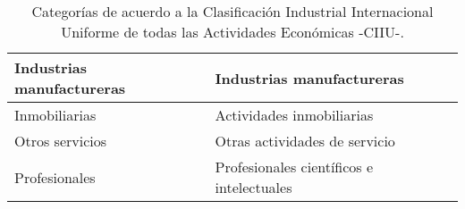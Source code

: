 \begin{description}
\begin{table}[ht]
\begin{tabular}{|l|l|}
Industrias manufactureras                              & Industrias manufactureras                                                                        \\ \hline
Inmobiliarias                                          & Actividades inmobiliarias                                                                        \\ \hline
Otros servicios                                        & Otras actividades de servicio                                                                    \\ \hline
Profesionales                                          & Profesionales científicos e intelectuales                                                        \\ \hline
\end{tabular}
\caption{Categorías de acuerdo a la Clasificación Industrial Internacional Uniforme de todas las Actividades Económicas -CIIU-.}
\label{tab:categorias}
\end{table}
\end{description}